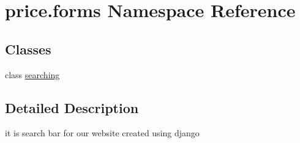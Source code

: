 \hypertarget{namespaceprice_1_1forms}{}\section{price.\+forms Namespace Reference}
\label{namespaceprice_1_1forms}
\subsection*{Classes}
\begin{DoxyCompactItemize}
\item 
class \hyperlink{classprice_1_1forms_1_1searching}{searching}
\end{DoxyCompactItemize}


\subsection{Detailed Description}
\begin{DoxyVerb}it is search bar for our website created using django
\end{DoxyVerb}
 